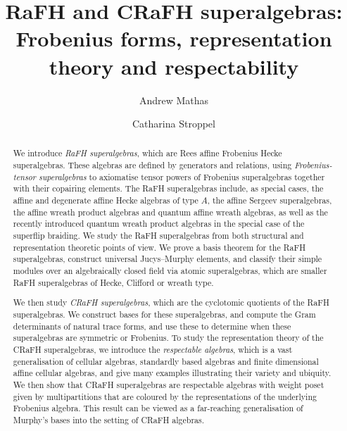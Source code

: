 \documentclass[a4paper,11pt]{amsart}
\title[RaFH and CRaFH superalgebras]
{RaFH and CRaFH superalgebras:\\ Frobenius forms, representation theory and respectability}\def\Email#1{\email{\href{mailto:#1}{#1}}}
\author{Andrew Mathas}
\author{Catharina Stroppel}
\numberwithin{equation}{subsection}
\theoremstyle{definition}
\theoremstyle{theorem}
\theoremstyle{remark}
\begin{document}
\begin{abstract}
We introduce \emph{RaFH superalgebras}, which are Rees affine Frobenius Hecke
superalgebras. These algebras are defined by generators and relations, using \emph{Frobenius-tensor superalgebras} to axiomatise tensor powers of Frobenius superalgebras together with their copairing elements. The RaFH superalgebras include, as special cases, the
affine and degenerate affine Hecke algebras of type $A$, the affine
Sergeev superalgebras, the affine wreath product algebras and quantum
affine wreath algebras, as well as the recently introduced quantum
wreath product algebras in the special case of the superflip braiding.
We study the RaFH superalgebras from both structural and
representation theoretic points of view. We prove a basis theorem for the
RaFH superalgebras, construct universal Jucys--Murphy elements, and
classify their simple modules over an algebraically closed field via
atomic superalgebras, which are smaller RaFH superalgebras of Hecke,
Clifford or wreath type.

We then study \emph{CRaFH superalgebras}, which are the cyclotomic quotients
of the RaFH superalgebras. We construct bases for these superalgebras, and
compute the Gram determinants of natural trace forms, and use these to
determine when these superalgebras are symmetric or Frobenius. To study the
representation theory of the CRaFH superalgebras,
we introduce the \emph{respectable algebras}, which is a
vast generalisation of cellular algebras, standardly based algebras and finite
dimensional affine cellular algebras, and give many examples
illustrating their variety and ubiquity.
We then show that CRaFH superalgebras are respectable algebras with
weight poset given by multipartitions that are coloured by the
representations of the underlying Frobenius algebra. This result can be
viewed as a far-reaching generalisation of Murphy's bases into the
setting of CRaFH algebras.
\end{abstract}

\maketitle

\tableofcontents
\end{document}
